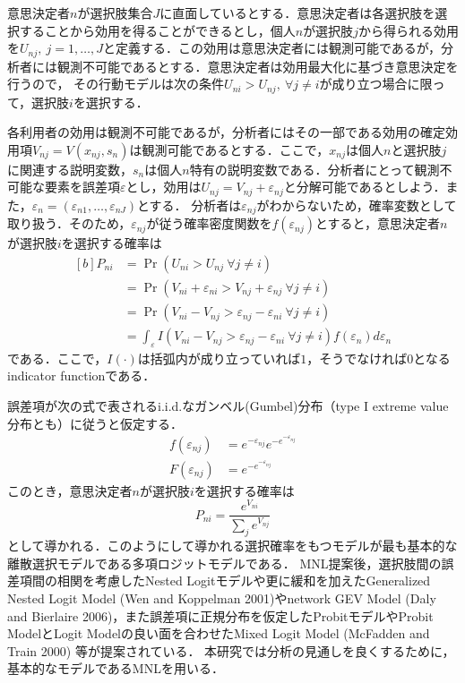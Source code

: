 \documentclass[japanese]{jnlp_1.4}
\begin{document}
意思決定者$n$が選択肢集合$J$に直面しているとする．意思決定者は各選択肢を選択することから効用を得ることができるとし，個人$n$が選択肢$j$から得られる効用を$U_{nj}, \ j=1,\ldots,J$と定義する．この効用は意思決定者には観測可能であるが，分析者には観測不可能であるとする．意思決定者は効用最大化に基づき意思決定を行うので，
その行動モデルは次の条件$U_{ni} > U_{nj},\ \forall j \not = i$が成り立つ場合に限って，選択肢$i$を選択する．

各利用者の効用は観測不可能であるが，分析者にはその一部である効用の確定効用項$V_{nj} = V(x_{nj}, s_{n})$は観測可能であるとする．ここで，$x_{nj}$は個人$n$と選択肢$j$に関連する説明変数，$s_n$は個人$n$特有の説明変数である．分析者にとって観測不可能な要素を誤差項$\varepsilon$とし，効用は$U_{nj} = V_{nj}+ \varepsilon_{nj}$と分解可能であるとしよう．また，$\varepsilon_n = (\varepsilon_{n1},\ldots,\varepsilon_{nJ})$とする．
分析者は$\varepsilon_{nj}$がわからないため，確率変数として取り扱う．そのため，$\varepsilon_{nj}$が従う確率密度関数を$f(\varepsilon_{nj})$とすると，意思決定者$n$が選択肢$i$を選択する確率は
\begin{equation}
\begin{aligned}[b]
 P_{ni} & = \Pr (U_{ni} > U_{nj} \ \forall j \not = i)  \\
  & =  \Pr (V_{ni}  + \varepsilon_{ni} > V_{nj} + \varepsilon_{nj} \ \forall j \not = i) \\
  & =  \Pr (V_{ni}  - V_{nj}  >  \varepsilon_{nj} - \varepsilon_{ni}  \ \forall j \not = i)  \\
  & =  \int_{\varepsilon} I(V_{ni}  - V_{nj}  >  \varepsilon_{nj} - \varepsilon_{ni}  \ \forall j \not = i) f(\varepsilon_n) d \varepsilon_n 
\end{aligned}
\end{equation}
である．ここで，$I(\cdot)$は括弧内が成り立っていれば$1$，そうでなければ$0$となるindicator functionである．

誤差項が次の式で表されるi.i.d.なガンベル(Gumbel)分布（type I extreme value分布とも）に従うと仮定する．
\begin{align}
f(\varepsilon_{nj}) & =  e^{-\varepsilon_{nj}} e^{-e^{-\varepsilon_{nj}}} \\
F(\varepsilon_{nj}) & =  e^{-e^{- \varepsilon_{nj}}}
\end{align}
このとき，意思決定者$n$が選択肢$i$を選択する確率は
\begin{equation}
P_{ni} = \frac{e^{V_{ni}}}{\sum_j e^{V_{nj}}} \label{eq:DCM}
\end{equation}
として導かれる．このようにして導かれる選択確率をもつモデルが最も基本的な離散選択モデルである多項ロジットモデルである．
MNL提案後，選択肢間の誤差項間の相関を考慮したNested Logitモデルや更に緩和を加えたGeneralized Nested Logit Model (Wen and Koppelman 2001)やnetwork GEV Model (Daly and Bierlaire 2006)，また誤差項に正規分布を仮定したProbitモデルやProbit ModelとLogit Modelの良い面を合わせたMixed Logit Model (McFadden and Train 2000) 等が提案されている．
本研究では分析の見通しを良くするために，基本的なモデルであるMNLを用いる．
\end{document}
